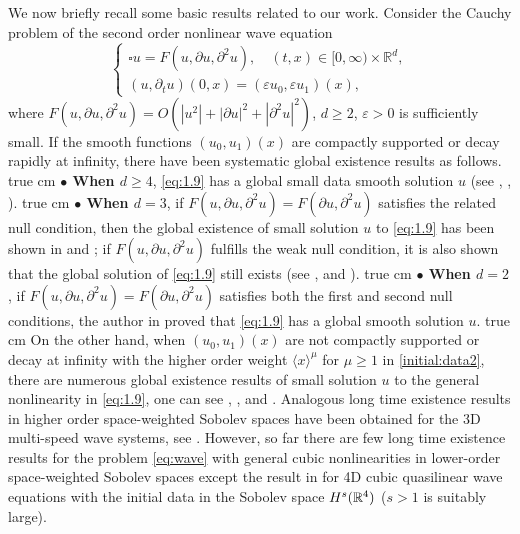 \documentclass[11pt,twoside]{article}
\newcommand{\w}[1]{\langle {#1} \rangle}
\theoremstyle{plain}
\theoremstyle{definition}
\numberwithin{equation}{section}
\begin{document}
We now briefly recall some basic results related to our work. Consider the
Cauchy problem of the second order nonlinear wave equation
\begin{equation}\label{eq:1.9}
\begin{cases}
\square u = F(u,\partial u,\partial^2 u), \quad (t,x) \in [0,\infty)\times\mathbb{R}^d,\\
(u,\partial_t u)(0,x) = (\varepsilon u_0,\varepsilon u_1)(x),
\end{cases}
\end{equation}
where $F(u,\partial u,\partial^2 u)=O(|u^2|+|\partial u|^2+|\partial^2 u|^2)$, $d\geq 2$, $\varepsilon>0$ is sufficiently small.
If the smooth functions $(u_0,u_1)(x)$ are compactly supported or decay rapidly at infinity, there have been
systematic global existence results as follows.
 true cm
{\bf $\bullet$ When $d \geq 4$},  \eqref{eq:1.9}
has a global small data smooth solution $u$ (see \cite{Hormander}, \cite{KlainermanPonce}, \cite{LiChen}).
 true cm
{\bf $\bullet$ When $d = 3$}, if  $F(u,\partial u,\partial^2 u)=F(\partial u,\partial^2 u)$ satisfies the related null condition,
then the global existence of small solution $u$ to \eqref{eq:1.9} has been shown in \cite{Christodoulou} and \cite{Klainerman2};
if $F(u,\partial u,\partial^2 u)$ fulfills the weak null condition, it is also shown that the global solution of \eqref{eq:1.9}
still exists (see \cite{Alinhac2}, \cite{DingLiuYin} and \cite{Lindblad}).
 true cm
{\bf $\bullet$ When $d=2$}, if $F(u,\partial u,\partial^2 u)=F(\partial u,\partial^2 u)$ satisfies both the first and second null conditions, the author in \cite{Alinhac1} proved that \eqref{eq:1.9} has a global smooth solution $u$.
 true cm
On the other hand, when $(u_0,u_1)(x)$ are not compactly supported or decay at infinity with the higher order weight
$\w{x}^{\mu}$ for $\mu\ge 1$ in \eqref{initial:data2}, there are numerous global existence results of small solution
$u$ to the general nonlinearity in \eqref{eq:1.9}, one can see \cite{Asa}, \cite{CaiLei}, \cite{HouYin1} and \cite{Pusateri}.
Analogous long time existence results in higher order space-weighted Sobolev spaces have been obtained for the 3D multi-speed wave systems, see \cite{Kat, Kji,Sideris,Pusateri}. However, so far there are few long time existence results for the problem \eqref{eq:wave}
with general cubic nonlinearities in lower-order space-weighted Sobolev spaces except the result in \cite{HouYin3} for 4D cubic quasilinear wave equations with the initial data in the Sobolev space $H^s(\Bbb R^4)$ ($s>1$ is suitably large).
\end{document}
